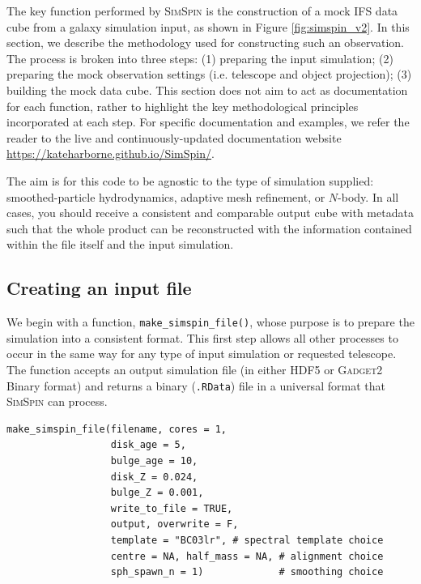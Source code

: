 \documentclass[
  journal=pasa,
  manuscript=research-paper, %
  year=2020,
  volume=37,
]{cup-journal}
\newcommand{\simspin}[1]{\textsc{SimSpin}#1} %
\newcommand{\gadget}[1]{\textsc{Gadget2}#1} %
\newcommand{\makesimspinfile}[1]{\texttt{make\_simspin\_file()}#1}
\begin{document}
The key function performed by \simspin{} is the construction of a mock IFS data cube from a galaxy simulation input, as shown in Figure \ref{fig:simspin_v2}. 
In this section, we describe the methodology used for constructing such an observation. 
The process is broken into three steps: (1) preparing the input simulation; (2) preparing the mock observation settings (i.e. telescope and object projection); (3) building the mock data cube. 
This section does not aim to act as documentation for each function, rather to highlight the key methodological principles incorporated at each step. 
For specific documentation and examples, we refer the reader to the live and continuously-updated documentation website \url{https://kateharborne.github.io/SimSpin/}.

The aim is for this code to be agnostic to the type of simulation supplied: smoothed-particle hydrodynamics, adaptive mesh refinement, or $N$-body. 
In all cases, you should receive a consistent and comparable output cube with metadata such that the whole product can be reconstructed with the information contained within the file itself and the input simulation.

\subsection{Creating an input file} \label{sec:make_simspin_file}

We begin with a function, \makesimspinfile, whose purpose is to prepare the simulation into a consistent format. 
This first step allows all other processes to occur in the same way for any type of input simulation or requested telescope.
The function accepts an output simulation file (in either HDF5 or \gadget{} Binary format) and returns a binary (\texttt{.RData}) file in a universal format that \simspin{} can process.

\begin{lstlisting}[basicstyle=\fontsize{6}{8}\selectfont\ttfamily]
make_simspin_file(filename, cores = 1,
                  disk_age = 5, 
                  bulge_age = 10,
                  disk_Z = 0.024, 
                  bulge_Z = 0.001,
                  write_to_file = TRUE, 
                  output, overwrite = F,
                  template = "BC03lr", # spectral template choice
                  centre = NA, half_mass = NA, # alignment choice
                  sph_spawn_n = 1)             # smoothing choice
\end{lstlisting}
\end{document}
